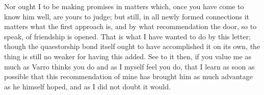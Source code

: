  Nor ought I to be making promises in matters which, once you have come to know him well, are yours to judge; but still, in all newly formed connections it matters what the first approach is, and by what recommendation the door, so to speak, of friendship is opened. That is what I have wanted to do by this letter; though the quaestorship bond itself ought to have accomplished it on its own, the thing is still no weaker for having this added. See to it then, if you value me as much as Varro thinks you do and as I myself feel you do, that I learn as soon as possible that this recommendation of mine has brought him as much advantage as he himself hoped, and as I did not doubt it would.
